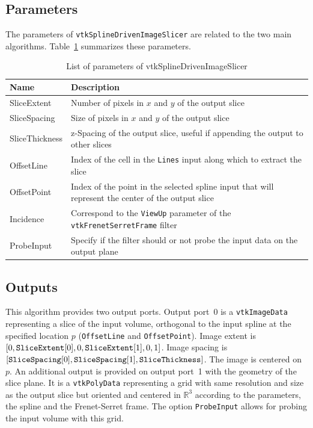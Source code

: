 \documentclass{InsightArticle}
\begin{document}
\subsection{Parameters}
%
The parameters of \verb!vtkSplineDrivenImageSlicer! are related to the two main
algorithms. Table~\ref{tab:parameters} summarizes these parameters.
%
\begin{table}
\centering
 \begin{tabular}{lp{10cm}}
Name & Description \\
\hline
SliceExtent & Number of pixels in $x$ and $y$ of the output slice \\
SliceSpacing & Size of pixels in $x$ and $y$ of the output slice \\
SliceThickness & z-Spacing of the output slice, useful if appending the output
to other slices \\
\hline
OffsetLine & Index of the cell in the \verb!Lines! input along which to extract
the slice \\
OffsetPoint & Index of the point in the selected spline input that will
represent the center of the output slice \\
Incidence & Correspond to the \verb!ViewUp! parameter of the
\verb!vtkFrenetSerretFrame! filter \\
\hline
ProbeInput & Specify if the filter should or not probe the input data on the
output plane 
 \end{tabular}
\caption{List of parameters of vtkSplineDrivenImageSlicer }
\label{tab:parameters}
\end{table}
%
\subsection{Outputs}
%
This algorithm provides two output ports. Output port~0 is a 
\verb!vtkImageData! representing a slice of the input volume, orthogonal to the
input spline at the specified location $p$ (\verb!OffsetLine! and 
\verb!OffsetPoint!). Image 
extent is $[0, \verb!SliceExtent![0], 0, \verb!SliceExtent![1], 0, 1]$. 
Image spacing is 
$[\verb!SliceSpacing![0], \verb!SliceSpacing![1], \verb!SliceThickness!]$. The
image is centered on $p$.
An additional output
is provided on output port~1 with the geometry of the slice plane.
It is a \verb!vtkPolyData! representing a grid with same resolution and size as
the output slice but oriented and centered in $\mathbb{R}^3$ according to the 
parameters, the spline and the Frenet-Serret frame. The option 
\verb!ProbeInput! allows for probing the input volume with this grid.
%
\end{document}
